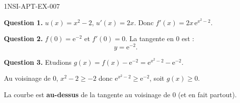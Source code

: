 \begin{corrige}{1NSI-APT-EX-007}

\textbf{Question 1.} $u(x) = x^2-2$, $u'(x) = 2x$. Donc $f'(x) = 2x\,\mathrm{e}^{x^2-2}$.


\textbf{Question 2.} $f(0) = \mathrm{e}^{-2}$ et $f'(0) = 0$. La tangente en $0$ est :
\[ y = \mathrm{e}^{-2}. \]

\textbf{Question 3.} Etudions $g(x) = f(x) - \mathrm{e}^{-2} = \mathrm{e}^{x^2-2} - \mathrm{e}^{-2}$.

Au voisinage de $0$, $x^2-2 \geq -2$ donc $\mathrm{e}^{x^2-2} \geq \mathrm{e}^{-2}$, soit $g(x) \geq 0$.

La courbe est \textbf{au-dessus} de la tangente au voisinage de $0$ (et en fait partout).

\end{corrige}
